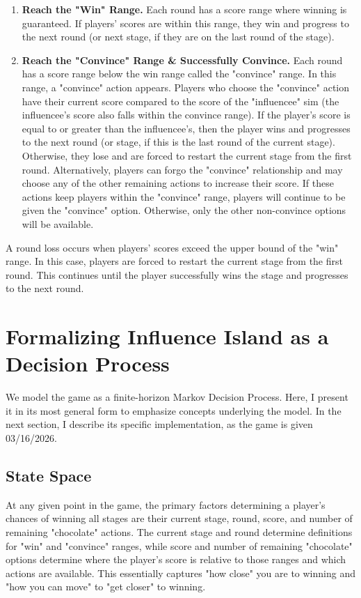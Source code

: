 \documentclass{article}
\begin{document}
    \begin{enumerate}
        \item \textbf{Reach the "Win" Range.} Each round has a score range where winning is guaranteed. 
        If players' scores are within this range, they win and progress to the next round (or next stage, if they are on the last round of the stage).
        \item \textbf{Reach the "Convince" Range \& Successfully Convince.} Each round has a score range below the win range called the "convince" range. In this range,
        a "convince" action appears. Players who choose the "convince" action have their current score compared to the score of the "influencee" sim (the influencee's score also falls within the convince range).
        If the player's score is equal to or greater than the influencee's, then the player wins and progresses to the next round (or stage, if this is the last round of the current stage). 
        Otherwise, they lose and are forced to restart the current stage from the first round. Alternatively, players can forgo the "convince" relationship and may choose any of the 
        other remaining actions to increase their score. If these actions keep players within the "convince" range, players will continue to be given the "convince" option. 
        Otherwise, only the other non-convince options will be available.
    \end{enumerate}

A round loss occurs when players' scores exceed the upper bound of the "win" range. In this case, 
players are forced to restart the current stage from the first round. This continues until the player successfully 
wins the stage and progresses to the next round. 

\section{Formalizing Influence Island as a Decision Process}

We model the game as a finite-horizon Markov Decision Process. 
Here, I present it in its most general form to emphasize concepts underlying the model.
In the next section, I describe its specific implementation, as the game is given 03/16/2026. 

\subsection{State Space}

At any given point in the game, the primary factors determining a player's chances of winning all stages are their
current stage, round, score, and number of remaining "chocolate" actions. The current stage and round 
determine definitions for "win" and "convince" ranges, while score and number of remaining "chocolate" options determine 
where the player's score is relative to those ranges and which actions are available. 
This essentially captures "how close" you are to winning and "how you can move" to "get closer" to winning.
\end{document}
